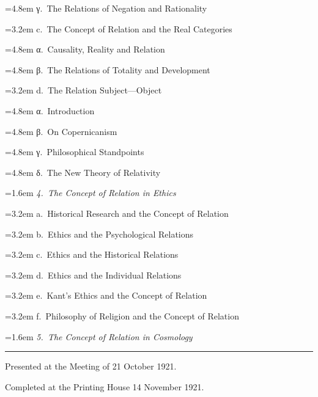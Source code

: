 \documentclass[12pt]{article}
\begin{document}
\hangindent=4.8em \hspace*{3.2em}γ.~The Relations of Negation and Rationality\par
\hangindent=3.2em \hspace*{1.6em}c.~The Concept of Relation and the Real Categories\par
\hangindent=4.8em \hspace*{3.2em}α.~Causality, Reality and Relation\par
\hangindent=4.8em \hspace*{3.2em}β.~The Relations of Totality and Development\par
\hangindent=3.2em \hspace*{1.6em}d.~The Relation Subject---Object\par
\hangindent=4.8em \hspace*{3.2em}α.~Introduction\par
\hangindent=4.8em \hspace*{3.2em}β.~On Copernicanism\par
\hangindent=4.8em \hspace*{3.2em}γ.~Philosophical Standpoints\par
\hangindent=4.8em \hspace*{3.2em}δ.~The New Theory of Relativity\par
\hangindent=1.6em \emph{4.~The Concept of Relation in Ethics}\par
\hangindent=3.2em \hspace*{1.6em}a.~Historical Research and the Concept of Relation\par
\hangindent=3.2em \hspace*{1.6em}b.~Ethics and the Psychological Relations\par
\hangindent=3.2em \hspace*{1.6em}c.~Ethics and the Historical Relations\par
\hangindent=3.2em \hspace*{1.6em}d.~Ethics and the Individual Relations\par
\hangindent=3.2em \hspace*{1.6em}e.~Kant's Ethics and the Concept of Relation\par
\hangindent=3.2em \hspace*{1.6em}f.~Philosophy of Religion and the Concept of Relation\par
\hangindent=1.6em \emph{5.~The Concept of Relation in Cosmology}\par
\endgroup
\vspace{5ex}
{\centering\rule{2.4cm}{0.4pt}\par}
\vspace{2ex}
{\centering\small Presented at the Meeting of 21 October 1921.\par
Completed at the Printing House 14 November 1921.\par}
\end{document}
